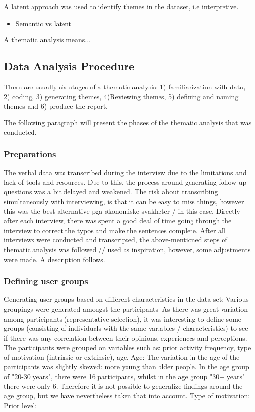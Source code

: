     A latent approach was used to identify themes in the dataset, i.e interpretive.  
    
\begin{itemize}
\item     Semantic vs latent
\end{itemize}
    A thematic analysis means... 
    
    \subsection{Data Analysis Procedure}
    There are usually six stages of a thematic analysis: 1) familiarization with data, 2) coding, 3) generating themes, 4)Reviewing themes, 5) defining and naming themes and 6) produce the report.
    
    The following paragraph will present the phases of the thematic analysis that was conducted. 
    
    \subsubsection{Preparations}
    The verbal data was transcribed during the interview due to the limitations and lack of tools and resources. Due to this, the process around generating follow-up questions was a bit delayed and weakened. The risk about transcribing simultaneously with interviewing, is that it can be easy to miss things, however this was the best alternative pga økonomiske svakheter / in this case. Directly after each interview, there was spent a good deal of time going through the interview to correct the typos and make the sentences complete. After all interviews were conducted and transcripted, the above-mentioned steps of thematic analysis was followed // used as inspiration, however, some adjustments were made. A description follows. 

    \subsubsection{Defining user groups}
    Generating user groups based on different characteristics in the data set: Various groupings were generated amongst the participants. As there was great variation among participants (representative selection), it was interesting to define some groups (consisting of individuals with the same variables / characteristics) to see if there was any correlation between their opinions, experiences and perceptions. The participants were grouped on variables such as: prior activity frequency, type of motivation (intrinsic or extrinsic), age.
    Age: The variation in the age of the participants was slightly skewed: more young than older people. In the age group of "20-30 years", there were 16 participants, whilst in the age group "30+ years" there were only 6. Therefore it is not possible to generalize findings around the age group, but we have nevertheless taken that into account.
    Type of motivation:
    Prior level: 
    
